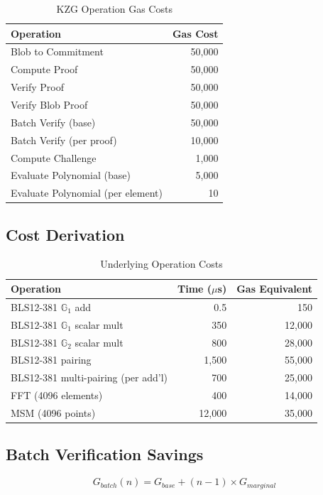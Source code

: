 \documentclass[11pt,a4paper]{article}
\theoremstyle{definition}
\begin{document}
\begin{table}[h]
\centering
\caption{KZG Operation Gas Costs}
\begin{tabular}{lr}
\toprule
Operation & Gas Cost \\
\midrule
Blob to Commitment & 50,000 \\
Compute Proof & 50,000 \\
Verify Proof & 50,000 \\
Verify Blob Proof & 50,000 \\
Batch Verify (base) & 50,000 \\
Batch Verify (per proof) & 10,000 \\
Compute Challenge & 1,000 \\
Evaluate Polynomial (base) & 5,000 \\
Evaluate Polynomial (per element) & 10 \\
\bottomrule
\end{tabular}
\end{table}

\subsection{Cost Derivation}

\begin{table}[h]
\centering
\caption{Underlying Operation Costs}
\begin{tabular}{lrr}
\toprule
Operation & Time ($\mu$s) & Gas Equivalent \\
\midrule
BLS12-381 $\mathbb{G}_1$ add & 0.5 & 150 \\
BLS12-381 $\mathbb{G}_1$ scalar mult & 350 & 12,000 \\
BLS12-381 $\mathbb{G}_2$ scalar mult & 800 & 28,000 \\
BLS12-381 pairing & 1,500 & 55,000 \\
BLS12-381 multi-pairing (per add'l) & 700 & 25,000 \\
FFT (4096 elements) & 400 & 14,000 \\
MSM (4096 points) & 12,000 & 35,000 \\
\bottomrule
\end{tabular}
\end{table}

\subsection{Batch Verification Savings}

\begin{equation}
G_{batch}(n) = G_{base} + (n-1) \times G_{marginal}
\end{equation}
\end{document}
